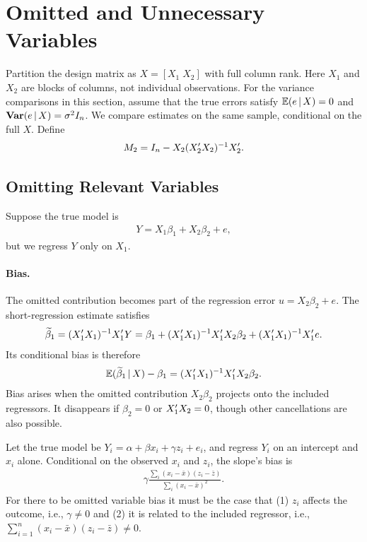 \documentclass[a4paper,12pt]{article}
\begin{document}
\section{Omitted and Unnecessary Variables}

Partition the design matrix as $X=[X_1\;X_2]$ with full column rank.
Here $X_1$ and $X_2$ are blocks of columns, not individual observations.
For the variance comparisons in this section, assume that the true errors satisfy
$\operatorname{\mathbb{E}}(e\mathpunct{}|\mathpunct{} X)=0$ and $\operatorname{\text{\textrm{\upshape\textbf{Var}}}}(e\mathpunct{}|\mathpunct{} X)=\sigma^2 I_n$.
We compare estimates on the same sample, conditional on the full $X$.
Define
\begin{align*}
	M_2=I_n-X_2(X_2^{\prime} X_2)^{-1} X_2^{\prime}.
\end{align*}

\subsection{Omitting Relevant Variables}

Suppose the true model is
\begin{align*}
	Y=X_1\beta_1+X_2\beta_2+e,
\end{align*}
but we regress $Y$ only on $X_1$.

\paragraph{Bias.}

The omitted contribution becomes part of the regression error $u=X_2\beta_2+e$.
The short-regression estimate satisfies
\begin{align}\label{eq-omitted-variable-bias}
	\widetilde\beta_1
	=(X_1^{\prime} X_1)^{-1} X_1^{\prime} Y
	=\beta_1+(X_1^{\prime} X_1)^{-1} X_1^{\prime} X_2\beta_2
	+(X_1^{\prime} X_1)^{-1} X_1^{\prime} e.
\end{align}
Its conditional bias is therefore
\begin{align}
	\operatorname{\mathbb{E}}(\widetilde\beta_1\mathpunct{}|\mathpunct{} X)-\beta_1
	=(X_1^{\prime} X_1)^{-1} X_1^{\prime} X_2\beta_2.
\end{align}
Bias arises when the omitted contribution $X_2\beta_2$ projects onto the included regressors.
It disappears if $\beta_2=0$ or $X_1^{\prime} X_2=0$, though other cancellations are also possible.

\begin{example}
	Let the true model be $Y_i=\alpha+\beta x_i+\gamma z_i+e_i$,
	and regress $Y_i$ on an intercept and $x_i$ alone.
	Conditional on the observed $x_i$ and $z_i$, the slope's bias is
	\begin{align*}
		\gamma\frac{\sum_i(x_i-\bar x)(z_i-\bar z)}{\sum_i(x_i-\bar x)^2}.
	\end{align*}
	For there to be omitted variable bias it must be the case that
	(1) $z_i$ affects the outcome, i.e., $\gamma\neq0$ and
	(2) it is related to the included regressor, i.e., $\sum_{i=1}^{n}(x_i-\bar x)(z_i-\bar z)\neq0$.
\end{example}
\end{document}
